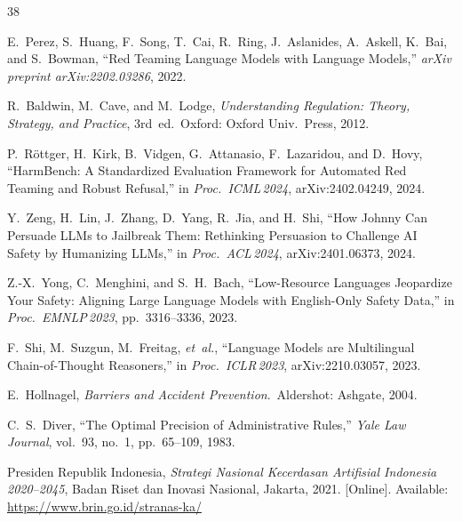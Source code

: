 \documentclass[conference]{IEEEtran}
\begin{document}
\begin{thebibliography}{38}

E.~Perez, S.~Huang, F.~Song, T.~Cai, R.~Ring, J.~Aslanides, A.~Askell,
K.~Bai, and S.~Bowman, ``Red Teaming Language Models with Language Models,''
\textit{arXiv preprint arXiv:2202.03286}, 2022.

R.~Baldwin, M.~Cave, and M.~Lodge, \textit{Understanding Regulation: Theory,
Strategy, and Practice}, 3rd~ed.\ Oxford: Oxford Univ.\ Press, 2012.

P.~R{\"o}ttger, H.~Kirk, B.~Vidgen, G.~Attanasio, F.~Lazaridou, and D.~Hovy,
``HarmBench: A Standardized Evaluation Framework for Automated Red Teaming
and Robust Refusal,'' in \textit{Proc.\ ICML\,2024}, arXiv:2402.04249, 2024.

Y.~Zeng, H.~Lin, J.~Zhang, D.~Yang, R.~Jia, and H.~Shi, ``How Johnny Can
Persuade LLMs to Jailbreak Them: Rethinking Persuasion to Challenge AI Safety
by Humanizing LLMs,'' in \textit{Proc.\ ACL\,2024}, arXiv:2401.06373, 2024.

Z.-X.~Yong, C.~Menghini, and S.~H.~Bach, ``Low-Resource Languages Jeopardize
Your Safety: Aligning Large Language Models with English-Only Safety Data,''
in \textit{Proc.\ EMNLP\,2023}, pp.~3316--3336, 2023.

F.~Shi, M.~Suzgun, M.~Freitag, \textit{et~al.}, ``Language Models are
Multilingual Chain-of-Thought Reasoners,'' in \textit{Proc.\ ICLR\,2023},
arXiv:2210.03057, 2023.

E.~Hollnagel, \textit{Barriers and Accident Prevention}.\ Aldershot: Ashgate,
2004.

C.~S.~Diver, ``The Optimal Precision of Administrative Rules,''
\textit{Yale Law Journal}, vol.~93, no.~1, pp.~65--109, 1983.

Presiden Republik Indonesia, \textit{Strategi Nasional Kecerdasan Artifisial
Indonesia 2020--2045}, Badan Riset dan Inovasi Nasional, Jakarta, 2021.
[Online]. Available: \url{https://www.brin.go.id/stranas-ka/}


\end{thebibliography}
\end{document}
